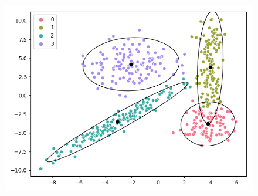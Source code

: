 \documentclass[a4paper]{article}
\begin{document}
\begin{figure}[h]
\begin{minipage}{0,35\textwidth}
\includegraphics[scale=.35]{em_general.png}
\end{minipage}
\end{figure}
\end{document}
